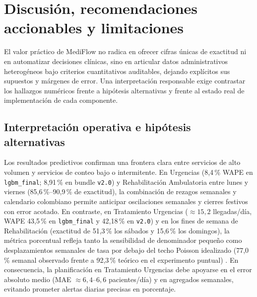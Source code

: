 
\section{Discusión, recomendaciones accionables y limitaciones}

El valor práctico de MediFlow no radica en ofrecer cifras únicas de exactitud ni en automatizar decisiones clínicas, sino en articular datos administrativos heterogéneos bajo criterios cuantitativos auditables, dejando explícitos sus supuestos y márgenes de error. Una interpretación responsable exige contrastar los hallazgos numéricos frente a hipótesis alternativas y frente al estado real de implementación de cada componente.

\subsection{Interpretación operativa e hipótesis alternativas}

Los resultados predictivos confirman una frontera clara entre servicios de alto volumen y servicios de conteo bajo o intermitente. En Urgencias (8,4\,\% WAPE en \texttt{lgbm\_final}; 8,91\,\% en bundle \texttt{v2.0}) y Rehabilitación Ambulatoria entre lunes y viernes (85,6\,\%--90,9\,\% de exactitud), la combinación de rezagos semanales y calendario colombiano permite anticipar oscilaciones semanales y cierres festivos con error acotado. En contraste, en Tratamiento Urgencias ($\approx 15{,}2$ llegadas/día, WAPE 43,5\,\% en \texttt{lgbm\_final} y 42,18\,\% en \texttt{v2.0}) y en los fines de semana de Rehabilitación (exactitud de 51,3\,\% los sábados y 15,6\,\% los domingos), la métrica porcentual refleja tanto la sensibilidad de denominador pequeño como desplazamientos semanales de tasa por debajo del techo Poisson idealizado (77,0\,\% semanal observado frente a 92,3\,\% teórico en el experimento puntual) \parencite{mediflow2026demanda}. En consecuencia, la planificación en Tratamiento Urgencias debe apoyarse en el error absoluto medio (MAE $\approx 6{,}4$--$6{,}6$ pacientes/día) y en agregados semanales, evitando prometer alertas diarias precisas en porcentaje.

